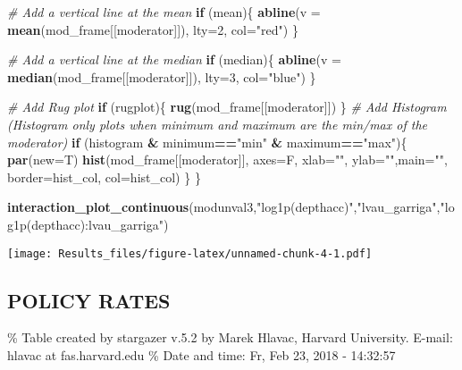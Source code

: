\documentclass[]{article}
\newenvironment{Shaded}{\begin{snugshade}}{\end{snugshade}}
\newcommand{\KeywordTok}[1]{\textcolor[rgb]{0.13,0.29,0.53}{\textbf{#1}}}
\newcommand{\DataTypeTok}[1]{\textcolor[rgb]{0.13,0.29,0.53}{#1}}
\newcommand{\DecValTok}[1]{\textcolor[rgb]{0.00,0.00,0.81}{#1}}
\newcommand{\StringTok}[1]{\textcolor[rgb]{0.31,0.60,0.02}{#1}}
\newcommand{\CommentTok}[1]{\textcolor[rgb]{0.56,0.35,0.01}{\textit{#1}}}
\newcommand{\ControlFlowTok}[1]{\textcolor[rgb]{0.13,0.29,0.53}{\textbf{#1}}}
\newcommand{\OperatorTok}[1]{\textcolor[rgb]{0.81,0.36,0.00}{\textbf{#1}}}
\newcommand{\NormalTok}[1]{#1}
\begin{document}
\begin{Shaded}
\begin{Highlighting}[]
  \CommentTok{# Add a vertical line at the mean}
  \ControlFlowTok{if}\NormalTok{ (mean)\{}
    \KeywordTok{abline}\NormalTok{(}\DataTypeTok{v =} \KeywordTok{mean}\NormalTok{(mod_frame[[moderator]]), }\DataTypeTok{lty=}\DecValTok{2}\NormalTok{, }\DataTypeTok{col=}\StringTok{"red"}\NormalTok{)}
\NormalTok{  \}}
  
  \CommentTok{# Add a vertical line at the median}
  \ControlFlowTok{if}\NormalTok{ (median)\{}
    \KeywordTok{abline}\NormalTok{(}\DataTypeTok{v =} \KeywordTok{median}\NormalTok{(mod_frame[[moderator]]), }\DataTypeTok{lty=}\DecValTok{3}\NormalTok{, }\DataTypeTok{col=}\StringTok{"blue"}\NormalTok{)}
\NormalTok{  \}}
  
  \CommentTok{# Add Rug plot}
  \ControlFlowTok{if}\NormalTok{ (rugplot)\{}
    \KeywordTok{rug}\NormalTok{(mod_frame[[moderator]])}
\NormalTok{  \}}
  \CommentTok{# Add Histogram (Histogram only plots when minimum and maximum are the min/max of the moderator)}
  \ControlFlowTok{if}\NormalTok{ (histogram }\OperatorTok{&}\StringTok{ }\NormalTok{minimum}\OperatorTok{==}\StringTok{"min"} \OperatorTok{&}\StringTok{ }\NormalTok{maximum}\OperatorTok{==}\StringTok{"max"}\NormalTok{)\{}
    \KeywordTok{par}\NormalTok{(}\DataTypeTok{new=}\NormalTok{T)}
    \KeywordTok{hist}\NormalTok{(mod_frame[[moderator]], }\DataTypeTok{axes=}\NormalTok{F, }\DataTypeTok{xlab=}\StringTok{""}\NormalTok{, }\DataTypeTok{ylab=}\StringTok{""}\NormalTok{,}\DataTypeTok{main=}\StringTok{""}\NormalTok{, }\DataTypeTok{border=}\NormalTok{hist_col, }\DataTypeTok{col=}\NormalTok{hist_col)}
\NormalTok{  \}}
\NormalTok{\}}

\KeywordTok{interaction_plot_continuous}\NormalTok{(modunval3,}\StringTok{"log1p(depthacc)"}\NormalTok{,}\StringTok{"lvau_garriga"}\NormalTok{,}\StringTok{"log1p(depthacc):lvau_garriga"}\NormalTok{)}
\end{Highlighting}
\end{Shaded}

\texttt{[image: Results\_files/figure-latex/unnamed-chunk-4-1.pdf]}

\subsection{POLICY RATES}\label{policy-rates}

\% Table created by stargazer v.5.2 by Marek Hlavac, Harvard University.
E-mail: hlavac at fas.harvard.edu \% Date and time: Fr, Feb 23, 2018 -
14:32:57
\end{document}
